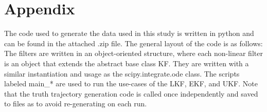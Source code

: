 \documentclass[11pt, a4paper]{article}
\begin{document}
\newpage
\section*{Appendix}
%
The code used to generate the data used in this study is written in python and can be found in the attached .zip file.
\vspace{5mm}
The general layout of the code is as follows:\\
The filters are written in an object-oriented structure, where each non-linear filter is an object that extends the abstract base class KF. 
They are written with a similar instantiation and usage as the scipy.integrate.ode class. 
The scripts labeled main\_* are used to run the use-cases of the LKF, EKF, and UKF. 
Note that the truth trajectory generation code is called once independently and saved to files as to avoid re-generating on each run.
\end{document}
